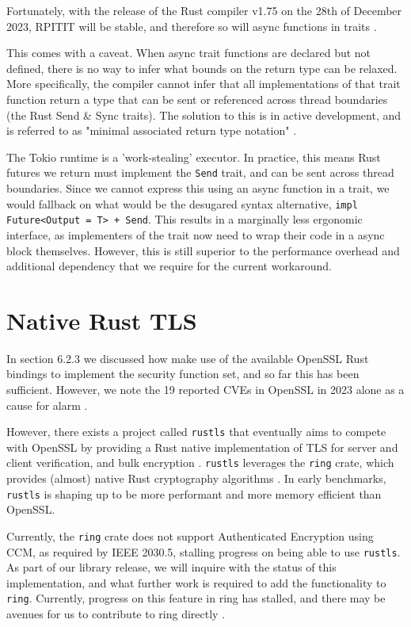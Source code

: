 Fortunately, with the release of the Rust compiler v1.75 on the 28th of December 2023, RPITIT will be stable, and therefore so will async functions in traits \cite{rust175}. 

This comes with a caveat. When async trait functions are declared but not defined, there is no way to infer what bounds on the return type can be relaxed. More specifically, the compiler cannot infer that all implementations of that trait function return a type that can be sent or referenced across thread boundaries (the Rust Send \& Sync traits). The solution to this is in active development, and is referred to as "minimal associated return type notation" \cite{sendboundproblem}.

The Tokio runtime is a 'work-stealing' executor. In practice, this means Rust futures we return must implement the \texttt{Send} trait, and can be sent across thread boundaries. Since we cannot express this using an async function in a trait, we would fallback on what would be the desugared syntax alternative, \texttt{impl Future<Output = T> + Send}. This results in a marginally less ergonomic interface, as implementers of the trait now need to wrap their code in a async block themselves. However, this is still superior to the performance overhead and additional dependency that we require for the current workaround.

\section{Native Rust TLS}
In section 6.2.3 we discussed how make use of the available OpenSSL Rust bindings to implement the security function set, and so far this has been sufficient. However, we note the 19 reported CVEs in OpenSSL in 2023 alone as a cause for alarm \cite{OpensslCVE}. 

However, there exists a project called \texttt{rustls} that eventually aims to compete with OpenSSL by providing a Rust native implementation of TLS for server and client verification, and bulk encryption \cite{rustls}. \texttt{rustls} leverages the \texttt{ring} crate, which provides (almost) native Rust cryptography algorithms \cite{ring}. 
In early benchmarks, \texttt{rustls} is shaping up to be more performant and more memory efficient than OpenSSL.

Currently, the \texttt{ring} crate does not support Authenticated Encryption using CCM, as required by IEEE 2030.5, stalling progress on being able to use \texttt{rustls}. As part of our library release, we will inquire with the status of this implementation, and what further work is required to add the functionality to \texttt{ring}. Currently, progress on this feature in ring has stalled, and there may be avenues for us to contribute to ring directly \cite{ringccmpr} \cite{ringccmissue}.

